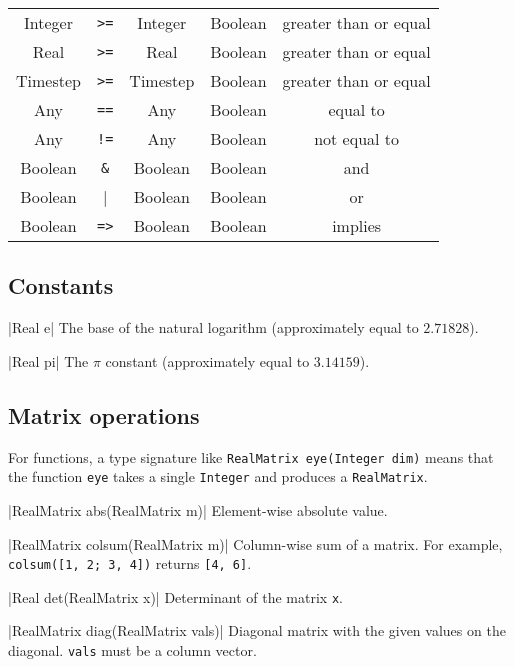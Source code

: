 \begin{table}[H]
\begin{tabular}{ c c c c c }
Integer & \verb|>=| & Integer & Boolean & greater than or equal \\
Real & \verb|>=| & Real & Boolean & greater than or equal \\
Timestep & \verb|>=| & Timestep & Boolean & greater than or equal \\

Any & \verb|==| & Any & Boolean & equal to \\

Any & \verb|!=| & Any & Boolean & not equal to \\

Boolean & \verb|&| & Boolean & Boolean & and \\

Boolean & \verb||| & Boolean & Boolean & or \\

Boolean & \verb|=>| & Boolean & Boolean & implies \\

\bottomrule
\end{tabular}
\end{table}


\subsection{Constants}
\label{sec:builtin-constants}

\blog|Real e|
\myindent The base of the natural logarithm (approximately equal to $2.71828$).

\blog|Real pi|
\myindent The $\pi$ constant (approximately equal to $3.14159$).


\subsection{Matrix operations}
\label{sec:builtin-matrix-ops}

For functions, a type signature like \verb|RealMatrix eye(Integer dim)| means
that the function \verb|eye| takes a single \verb|Integer| and produces a
\verb|RealMatrix|.

\blog|RealMatrix abs(RealMatrix m)|
\myindent Element-wise absolute value.

\blog|RealMatrix colsum(RealMatrix m)|
\myindent Column-wise sum of a matrix.
For example, \verb|colsum([1, 2; 3, 4])| returns \verb|[4, 6]|.

\blog|Real det(RealMatrix x)|
\myindent Determinant of the matrix \verb|x|.

\blog|RealMatrix diag(RealMatrix vals)|
\myindent Diagonal matrix with the given values on the diagonal. \verb|vals|
must be a column vector.

